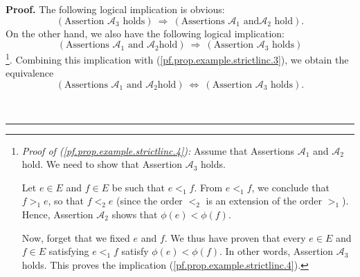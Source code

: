 \documentclass[numbers=enddot,12pt,final,onecolumn,notitlepage,abstracton]{scrartcl}
\theoremstyle{definition}
\newenvironment{proof}[1][Proof]{\noindent\textbf{#1.} }{\ \rule{0.5em}{0.5em}}
\newenvironment{verlong}{}{}
\begin{document}
\begin{verlong}
\begin{footnotesize}
\begin{proof}
The following logical implication is obvious:%
\begin{equation}
\left(  \text{Assertion }\mathcal{A}_{3}\text{ holds}\right)
\ \Longrightarrow\ \left(  \text{Assertions }\mathcal{A}_{1}\text{ and
}\mathcal{A}_{2}\text{ hold}\right)  . \label{pf.prop.example.strictlinc.3}%
\end{equation}
On the other hand, we also have the following logical implication:%
\begin{equation}
\left(  \text{Assertions }\mathcal{A}_{1}\text{ and }\mathcal{A}_{2}\text{
hold}\right)  \ \Longrightarrow\ \left(  \text{Assertion }\mathcal{A}%
_{3}\text{ holds}\right)  \label{pf.prop.example.strictlinc.4}%
\end{equation}
\footnote{\textit{Proof of (\ref{pf.prop.example.strictlinc.4}):} Assume that
Assertions $\mathcal{A}_{1}$ and $\mathcal{A}_{2}$ hold. We need to show that
Assertion $\mathcal{A}_{3}$ holds.
\par
Let $e\in E$ and $f\in E$ be such that $e<_{1}f$. From $e<_{1}f$, we conclude
that $f>_{1}e$, so that $f<_{2}e$ (since the order $<_{2}$ is an extension of
the order $>_{1}$). Hence, Assertion $\mathcal{A}_{2}$ shows that $\phi\left(
e\right)  <\phi\left(  f\right)  $.
\par
Now, forget that we fixed $e$ and $f$. We thus have proven that every $e\in E$
and $f\in E$ satisfying $e<_{1}f$ satisfy $\phi\left(  e\right)  <\phi\left(
f\right)  $. In other words, Assertion $\mathcal{A}_{3}$ holds. This proves
the implication (\ref{pf.prop.example.strictlinc.4}).}. Combining this
implication with (\ref{pf.prop.example.strictlinc.3}), we obtain the
equivalence%
\[
\left(  \text{Assertions }\mathcal{A}_{1}\text{ and }\mathcal{A}_{2}\text{
hold}\right)  \ \Longleftrightarrow\ \left(  \text{Assertion }\mathcal{A}%
_{3}\text{ holds}\right)  .
\]



\end{proof}
\end{footnotesize}
\end{verlong}
\end{document}
